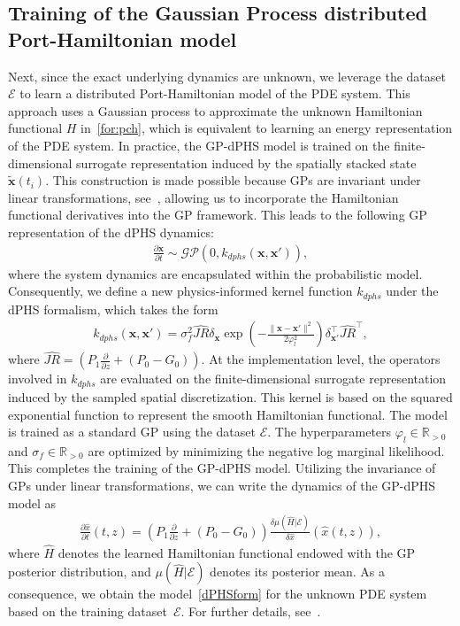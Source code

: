 \documentclass[letterpaper, 10 pt, conference]{ieeeconf}  %
\newcounter{part} %
\newcommand{\R}{\mathbb{R}}
\newcommand{\bm}[1]{{\boldsymbol{#1}}}
\newcommand{\x}{\bm x}
\begin{document}
\subsection{Training of the Gaussian Process distributed Port-Hamiltonian model} \label{subsubsec:trainingGPdPHS}
Next, since the exact underlying dynamics are unknown, we leverage the dataset \(\mathcal{E}\) to learn a distributed Port-Hamiltonian model of the PDE system. This approach uses a Gaussian process to approximate the unknown Hamiltonian functional $H$ in~\cref{for:pch}, which is equivalent to learning an energy representation of the PDE system. In practice, the GP-dPHS model is trained on the finite-dimensional surrogate representation induced by the spatially stacked state \(\tilde{\x}(t_i)\). This construction is made possible because GPs are invariant under linear transformations, see~\cite{9992733}, allowing us to incorporate the Hamiltonian functional derivatives into the GP framework. This leads to the following GP representation of the dPHS dynamics:
\begin{align}
    \frac{\partial \x}{\partial t} \sim \mathcal{GP}(0, k_{dphs}(\x, \x')), \label{gp:frac}
\end{align}
where the system dynamics are encapsulated within the probabilistic model. Consequently, we define a new physics-informed kernel function \( k_{dphs} \) under the dPHS formalism, which takes the form
\begin{align}
    k_{dphs}(\x, \x') = \sigma^2_f\widehat{JR} \delta_\x \exp\left(-\frac{\|\x - \x'\|^2}{2 \varphi_l^2}\right)\delta_{\x'}^\top \widehat{JR}^\top,
\end{align}
where $\widehat{JR} = \left(P_1 \frac{\partial}{\partial z}  + (P_0 - G_0)\right)$. At the implementation level, the operators involved in \(k_{dphs}\) are evaluated on the finite-dimensional surrogate representation induced by the sampled spatial discretization. This kernel is based on the squared exponential function to represent the smooth Hamiltonian functional. The model is trained as a standard GP using the dataset \(\mathcal{E}\). The hyperparameters \( \varphi_l\in\R_{>0} \) and \( \sigma_f\in\R_{>0} \) are optimized by minimizing the negative log marginal likelihood. This completes the training of the GP-dPHS model. Utilizing the invariance of GPs under linear transformations, we can write the dynamics of the GP-dPHS model as
\vspace{-5pt}
\begin{align}\label{dPHSform}
\frac{\partial \hat{x}}{\partial t}(t,z) = \left(P_1 \frac{\partial}{\partial z}  + (P_0 - G_0)\right)\frac{\delta \mu(\hat{H}|\mathcal{E})}{\delta \hat{x}}(\hat{x}(t,z)),
\end{align}
where \(\hat{H}\) denotes the learned Hamiltonian functional endowed with the GP posterior distribution, and \(\mu(\hat{H}|\mathcal{E})\) denotes its posterior mean. As a consequence, we obtain the model~\cref{dPHSform} for the unknown PDE system based on the training dataset~\(\mathcal{E}\). For further details, see~\cite{tan2024physics}.
\end{document}
